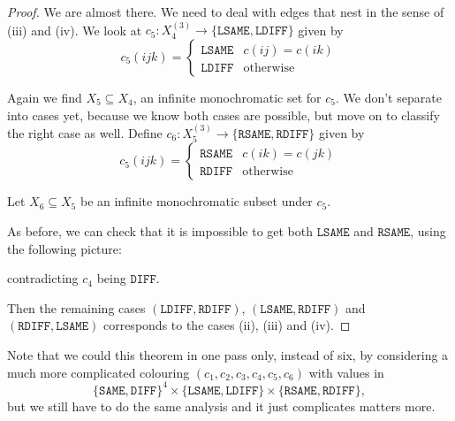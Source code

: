 \documentclass[a4paper]{article}
\begin{document}
\begin{proof}
  We are almost there. We need to deal with edges that nest in the sense of (iii) and (iv). We look at $c_5: X_4^{(3)} \to \{\mathtt{LSAME}, \mathtt{LDIFF}\}$ given by
  \[
    c_5(ijk) =
    \begin{cases}
      \mathtt{LSAME} & c(ij) = c(ik)\\
      \mathtt{LDIFF} & \mathrm{otherwise}
    \end{cases}
  \]
  \begin{center}
  \end{center}
  Again we find $X_5 \subseteq X_4$, an infinite monochromatic set for $c_5$. We don't separate into cases yet, because we know both cases are possible, but move on to classify the right case as well. Define $c_6: X_5^{(3)} \to \{\mathtt{RSAME}, \mathtt{RDIFF}\}$ given by
  \[
    c_5(ijk) =
    \begin{cases}
      \mathtt{RSAME} & c(ik) = c(jk)\\
      \mathtt{RDIFF} & \mathrm{otherwise}
    \end{cases}
  \]
  \begin{center}
  \end{center}
  Let $X_6 \subseteq X_5$ be an infinite monochromatic subset under $c_5$.

  As before, we can check that it is impossible to get both $\mathtt{LSAME}$ and $\mathtt{RSAME}$, using the following picture:
  \begin{center}
  \end{center}
  contradicting $c_4$ being $\mathtt{DIFF}$.

  Then the remaining cases $(\mathtt{LDIFF}, \mathtt{RDIFF})$, $(\mathtt{LSAME}, \mathtt{RDIFF})$ and $(\mathtt{RDIFF}, \mathtt{LSAME})$ corresponds to the cases (ii), (iii) and (iv).
\end{proof}
Note that we could this theorem in one pass only, instead of six, by considering a much more complicated colouring $(c_1, c_2, c_3, c_4, c_5, c_6)$ with values in
\[
  \{\mathtt{SAME}, \mathtt{DIFF}\}^4 \times \{\mathtt{LSAME}, \mathtt{LDIFF}\} \times \{\mathtt{RSAME}, \mathtt{RDIFF}\},
\]
but we still have to do the same analysis and it just complicates matters more.
\end{document}
